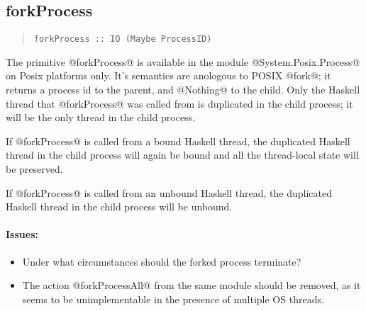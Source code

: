 \documentclass[a4paper,twoside]{article}
\begin{document}
\subsection{forkProcess}

\begin{quote}
\begin{verbatim}
forkProcess :: IO (Maybe ProcessID)
\end{verbatim}
\end{quote}

The primitive @forkProcess@ is available in the module @System.Posix.Process@
on Posix platforms only.
It's semantics are anologous to POSIX @fork@; it returns a process
id to the parent, and @Nothing@ to the child. Only the Haskell thread that
@forkProcess@ was called from is duplicated in the child process; it
will be the only thread in the child process.

If @forkProcess@ is called from a bound Haskell thread, the duplicated Haskell
thread in the child process will again be bound and all the thread-local
state will be preserved.

If @forkProcess@ is called from an unbound Haskell thread, the duplicated
Haskell thread in the child process will be unbound.

\paragraph{Issues:}
\begin{itemize}
\item Under what circumstances should the forked process terminate?
\item The action @forkProcessAll@ from the same module should be removed, as
      it seems to be unimplementable in the presence of multiple OS threads.
\end{itemize}
\end{document}

